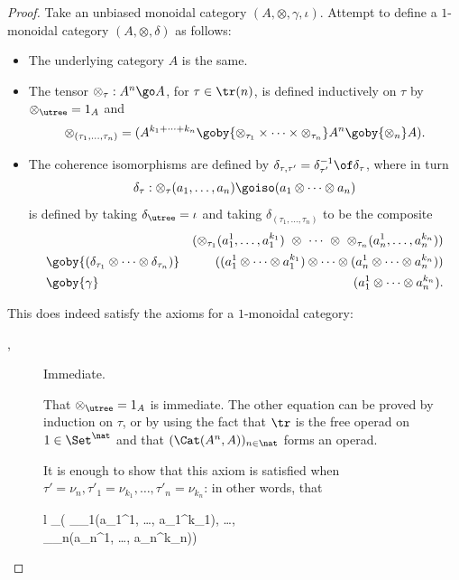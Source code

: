 \begin{proof}
Take an unbiased monoidal category $(A, \otimes, \gamma, \iota)$.  Attempt
to define a $1$-monoidal category $(A, \otimes, \delta)$ as follows:
%
\begin{itemize}
\item The underlying category $A$ is the same.
\item The tensor $\otimes_\tau: A^n \go A$, for $\tau\in\tr(n)$, is defined
inductively on $\tau$ by $\otimes_\utree = 1_A$ and 
\[
\otimes_{(\tau_1, \ldots, \tau_n)} = 
(A^{k_1 + \cdots + k_n} 
\goby{\otimes_{\tau_1} \times\cdots\times \otimes_{\tau_n}}
A^n \goby{\otimes_n} A).
\]
\item The coherence isomorphisms are defined by $\delta_{\tau, \tau'} =
\delta_{\tau'}^{-1} \of \delta_\tau$, where in turn
\[
\delta_\tau: \otimes_\tau(a_1, \ldots, a_n) \goiso 
(a_1 \otimes\cdots\otimes a_n)
\]
is defined by taking $\delta_\utree = \iota$ and taking $\delta_{(\tau_1,
\ldots, \tau_n)}$ to be the composite
%
\begin{eqnarray*}
&&
(\otimes_{\tau_1}(a_1^1, \ldots, a_1^{k_1}) 
\ \otimes\ \cdots\ \otimes\ 
\otimes_{\tau_n}(a_n^1, \ldots, a_n^{k_n}) )	\\ &
\goby{(\delta_{\tau_1} \otimes\cdots\otimes \delta_{\tau_n})} &	
((a_1^1 \otimes\cdots\otimes a_1^{k_1}) \otimes\cdots\otimes
(a_n^1 \otimes\cdots\otimes a_n^{k_n}))		\\
&
\goby{\gamma}	&	
(a_1^1 \otimes\cdots\otimes a_n^{k_n}).
\end{eqnarray*}
%
\end{itemize}
% 
This does indeed satisfy the axioms for a $1$-monoidal category:
%
\begin{description}
\item[, ] Immediate.
\item[] That $\otimes_\utree = 1_A$ is immediate.  The other
equation can be proved by induction on $\tau$, or by using the fact that
$\tr$ is the free operad on $1 \in\Set^\nat$ and that
$(\Cat(A^n,A))_{n\in\nat}$ forms an operad.
\item[] It is enough to show that this axiom is satisfied when
$\tau'=\nu_n, \tau'_1=\nu_{k_1}, \ldots, \tau'_n=\nu_{k_n}$: in other
words, that
%
\begin{diagram}[width=2em]
\begin{array}[t]{l}
\otimes_\tau ( \otimes_{\tau_1}(a_1^1, \ldots, a_1^{k_1}), \ldots, \\
\otimes_{\tau_n}(a_n^1, \ldots, a_n^{k_n}))			

\end{array}
\end{diagram}
\end{description}
\end{proof}
